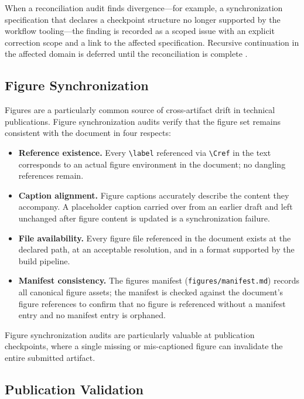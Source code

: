 When a reconciliation audit finds divergence---for example, a synchronization specification that declares a checkpoint structure no longer supported by the workflow tooling---the finding is recorded as a scoped issue with an explicit correction scope and a link to the affected specification. Recursive continuation in the affected domain is deferred until the reconciliation is complete \cite{Beer1972BrainFirm}.

\subsection{Figure Synchronization}

Figures are a particularly common source of cross-artifact drift in technical publications. Figure synchronization audits verify that the figure set remains consistent with the document in four respects:

\begin{itemize}
  \item \textbf{Reference existence.} Every \texttt{\textbackslash{}label} referenced via \texttt{\textbackslash{}Cref} in the text corresponds to an actual figure environment in the document; no dangling references remain.
  \item \textbf{Caption alignment.} Figure captions accurately describe the content they accompany. A placeholder caption carried over from an earlier draft and left unchanged after figure content is updated is a synchronization failure.
  \item \textbf{File availability.} Every figure file referenced in the document exists at the declared path, at an acceptable resolution, and in a format supported by the build pipeline.
  \item \textbf{Manifest consistency.} The figures manifest (\texttt{figures/manifest.md}) records all canonical figure assets; the manifest is checked against the document's figure references to confirm that no figure is referenced without a manifest entry and no manifest entry is orphaned.
\end{itemize}

Figure synchronization audits are particularly valuable at publication checkpoints, where a single missing or mis-captioned figure can invalidate the entire submitted artifact.

\subsection{Publication Validation}

